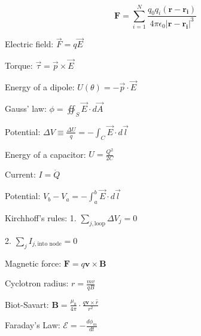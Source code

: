 \documentclass[12pt,a4paper]{article}
\begin{document}
	\[
	\mathbf{F} = \sum_{i=1}^{N} \frac{q_0 q_i (\mathbf{r}-\mathbf{r_i})}{4\pi \epsilon_0 |\mathbf{r}-\mathbf{r_i}|^3}
	\]
	
	Electric field: \(\vec{F} = q \vec{E}\)
	
	Torque: \( \vec{\tau} = \vec{p} \times \vec{E} \)
	
	Energy of a dipole: \( U(\theta) = -\vec{p} \cdot \vec{E} \)
	
	Gauss' law: \( \phi = \oiint_{S} \vec{E} \cdot d\vec{A} \)
	
	Potential: \( \Delta V \equiv \frac{\Delta U}{q} = - \int_{C} \vec{E} \cdot d\vec{l} \)
	
	Energy of a capacitor: \( U = \frac{Q^2}{2C} \)
	
	Current: \( I = \dot{Q} \)
	
	Potential: \( V_b - V_a = -\int_{a}^{b} \vec{E} \cdot d\vec{l} \)
	
	Kirchhoff's rules:
	1. \( \sum_{j, \text{loop}} \Delta V_j = 0 \)
	2. \( \sum_{j} I_{j, \text{into node}} = 0 \)

	
	Magnetic force: \( \mathbf{F} = q\mathbf{v} \times \mathbf{B} \)
	
	Cyclotron radius: \( r = \frac{mv}{qB} \)
	
	Biot-Savart: \( \mathbf{B} = \frac{\mu_0}{4 \pi} \cdot \frac{q \mathbf{v} \times \hat{r}}{r^2} \)
	
	Faraday's Law: \( \mathcal{E} = -\frac{d \phi_m}{dt} \)
	
\end{document}
